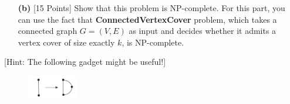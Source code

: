 \documentclass[10pt]{article}
\begin{document}
\begin{itemize}
    \item [\textbf{(b)}] {[15 Points]} Show that this problem is NP-complete. For this part, you can use the fact that \textbf{ConnectedVertexCover} problem, which takes a connected graph $G = (V, E)$ as input and decides whether it admits a vertex cover of size exactly $k$, is NP-complete.
\end{itemize}

{[Hint: The following gadget might be useful!]}
\begin{figure}[h]
    \includegraphics[width=0.2\textwidth]{A3_1.png}
\end{figure}
\end{document}
